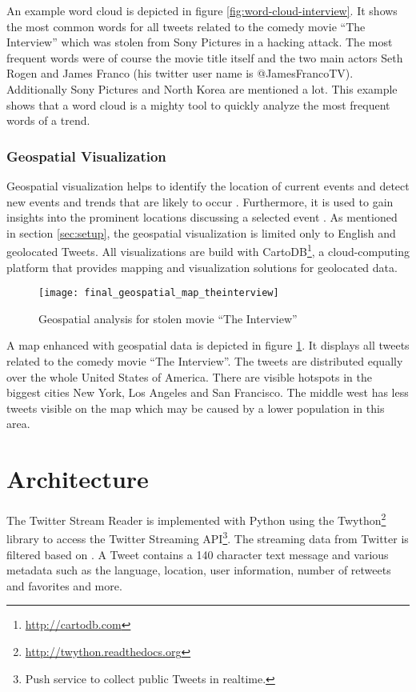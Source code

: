 An example word cloud is depicted in figure \ref{fig:word-cloud-interview}. It shows the most common words for all tweets related to the comedy movie \enquote{The Interview} which was stolen from Sony Pictures in a hacking attack. The most frequent words were of course the movie title itself and the two main actors Seth Rogen and James Franco (his twitter user name is @JamesFrancoTV). Additionally Sony Pictures and North Korea are mentioned a lot. This example shows that a word cloud is a mighty tool to quickly analyze the most frequent words of a trend.


\subsubsection{Geospatial Visualization}
\label{subsubsection:vis-geospatial}
Geospatial visualization helps to identify the location of current events and detect new events and trends that are likely to occur \cite{TwitterDataAnalytics2013}. Furthermore, it is used to gain insights into the prominent locations discussing a selected event \cite[64-66]{TwitterDataAnalytics2013}. As mentioned in section \ref{sec:setup}, the geospatial visualization is limited only to English and geolocated Tweets. All visualizations are build with CartoDB\footnote{\url{http://cartodb.com} \accessednote}, a cloud-computing platform that provides mapping and visualization solutions for geolocated data. 

\begin{figure}[H]
  \centering
        \texttt{[image: final\_geospatial\_map\_theinterview]}
  \caption[Geospatial analysis for stolen movie \enquote{The Interview}]{Geospatial analysis for stolen movie \enquote{The Interview}}
  \label{fig:map-interview}
  \vspace{-1.3em}
\end{figure}

A map enhanced with geospatial data is depicted in figure \ref{fig:map-interview}. It displays all tweets related to the comedy movie \enquote{The Interview}. The tweets are distributed equally over the whole United States of America. There are visible hotspots in the biggest cities New York, Los Angeles and San Francisco. The middle west has less tweets visible on the map which may be caused by a lower population in this area.

\section{Architecture}
\label{sec:architecture}
The Twitter Stream Reader is implemented with Python using the Twython\footnote{\url{http://twython.readthedocs.org} \accessednote} library to access the Twitter Streaming API\footnote{Push service to collect public Tweets in realtime.}. The streaming data from Twitter is filtered based on . A Tweet contains a 140 character text message and various metadata such as the language, location, user information, number of retweets and favorites and more. 

